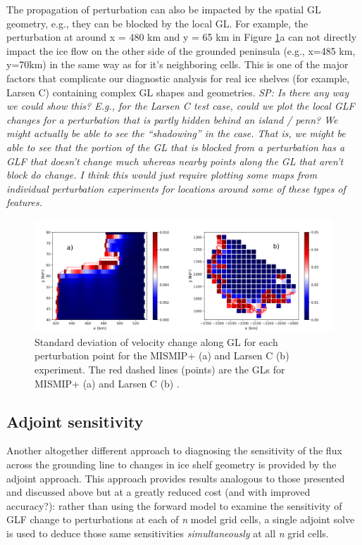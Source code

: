 \documentclass[review,oneside]{igs}
\begin{document}
The propagation of perturbation can also be impacted by the spatial GL geometry, e.g., they can be blocked by the local GL. For example, the perturbation at around x = 480 km and y = 65 km in Figure \ref{fig8}a can not directly impact the ice flow on the other side of the grounded peninsula (e.g., x=485 km, y=70km) in the same way as for it's neighboring cells. This is one of the major factors that complicate our diagnostic analysis for real ice shelves (for example, Larsen C) containing complex GL shapes and geometries. \textit{SP: Is there any way we could show this? E.g., for the Larsen C test case, could we plot the local GLF changes for a perturbation that is partly hidden behind an island / penn? We might actually be able to see the ``shadowing'' in the case. That is, we might be able to see that the portion of the GL that is blocked from a perturbation has a GLF that doesn't change much whereas nearby points along the GL that aren't block do change. I think this would just require plotting some maps from individual perturbation experiments for locations around some of these types of features.}
 
\begin{figure}
	\centering
    \includegraphics[width=1\linewidth]{figs/fig8.pdf}
    \caption{Standard deviation of velocity change along GL for each perturbation point for the MISMIP+ (a) and Larsen C (b) experiment. The red dashed lines (points) are the GLs for MISMIP+ (a) and Larsen C (b) .}
	\label{fig8}
\end{figure}

\subsection{Adjoint sensitivity}

Another altogether different approach to diagnosing the sensitivity of the flux across the grounding line to changes in ice shelf geometry is provided by the adjoint approach. This approach provides results analogous to those presented and discussed above but at a greatly reduced cost (and with improved accuracy?): rather than using the forward model to examine the sensitivity of GLF change to perturbations at each of \textit{n} model grid cells, a single adjoint solve is used to deduce those same sensitivities \textit{simultaneously} at all \textit{n} grid cells. 
\end{document}
